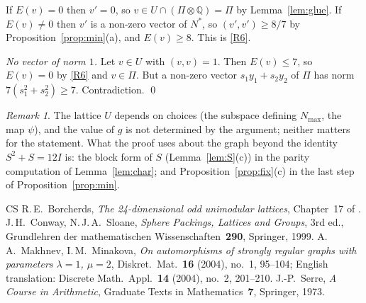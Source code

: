 \documentclass[11pt,a4paper]{article}
\theoremstyle{definition}
\theoremstyle{remark}
\newtheorem{remark}[theorem]{Remark}
\newcommand{\QQ}{\mathbb{Q}}
\begin{document}
If $E(v)=0$ then $v'=0$, so $v\in U\cap(\Pi\otimes\QQ)=\Pi$ by Lemma~\ref{lem:glue}. If $E(v)\ne0$ then $v'$ is a
non-zero vector of $N^*$, so $(v',v')\ge8/7$ by Proposition~\ref{prop:min}(a), and $E(v)\ge8$. This is \ref{R6}.

\medskip\noindent\emph{No vector of norm $1$.} Let $v\in U$ with $(v,v)=1$. Then $E(v)\le7$, so $E(v)=0$ by
\ref{R6} and $v\in\Pi$. But a non-zero vector $s_1y_1+s_2y_2$ of $\Pi$ has norm $7(s_1^2+s_2^2)\ge7$. Contradiction.
\qed

\begin{remark}
The lattice $U$ depends on choices (the subspace defining $N_{\max}$, the map $\psi$), and the value of $g$ is not
determined by the argument; neither matters for the statement. What the proof uses about the graph beyond the
identity $S^2+S=12I$ is: the block form of $S$ (Lemma~\ref{lem:S}(c)) in the parity computation of
Lemma~\ref{lem:char}; and Proposition~\ref{prop:fix}(c) in the last step of Proposition~\ref{prop:min}.
\end{remark}

\begin{thebibliography}{CS}
 R.\,E.~Borcherds, \emph{The 24-dimensional odd unimodular lattices}, Chapter~17 of \cite{CS}.
 J.\,H.~Conway, N.\,J.\,A.~Sloane, \emph{Sphere Packings, Lattices and Groups}, 3rd ed., Grundlehren
der mathematischen Wissenschaften~\textbf{290}, Springer, 1999.
 A.\,A.~Makhnev, I.\,M.~Minakova, \emph{On automorphisms of strongly regular graphs with parameters
$\lambda=1$, $\mu=2$}, Diskret.\ Mat.\ \textbf{16} (2004), no.~1, 95--104; English translation: Discrete Math.\ Appl.\
\textbf{14} (2004), no.~2, 201--210.
 J.-P.~Serre, \emph{A Course in Arithmetic}, Graduate Texts in Mathematics~\textbf{7}, Springer, 1973.
\end{thebibliography}
\end{document}

